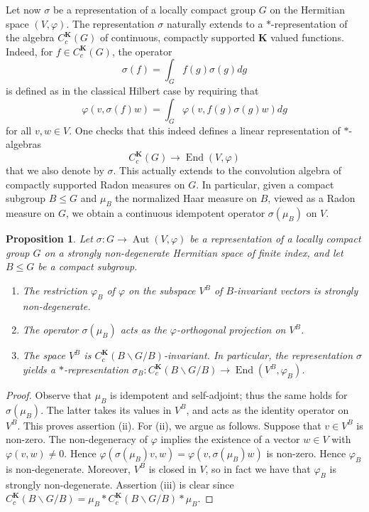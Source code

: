 \documentclass[12pt,a4paper]{amsproc}
\newtheorem{proposition}[theorem]{Proposition}
\theoremstyle{definition}
\DeclareMathOperator{\Aut}{Aut}
\DeclareMathOperator{\End}{End}
\newcommand{\KK}{\mathbf K}
\begin{document}
Let now $\sigma $ be a representation of a locally compact group $G$ on the Hermitian space $(V, \varphi)$. The representation $\sigma$ naturally extends to a $*$-representation of the algebra $C_c^\KK(G)$ of continuous, compactly supported $\KK$ valued functions. Indeed, for $f \in C_c^\KK(G)$, the operator 
$$\sigma(f) = \int_G f(g) \sigma(g)dg$$
is defined as in the classical Hilbert case by requiring that
$$\varphi(v, \sigma(f)w) = \int_G  \varphi(v, f(g)\sigma(g)w)dg$$
for all $v, w \in V$. One checks that this indeed defines a linear representation of $*$-algebras 
$$C_c^\KK(G) \to \End(V, \varphi)$$
that we also denote by $\sigma$. This actually extends to the convolution algebra of compactly supported Radon measures on $G$. In particular, given a compact subgroup $B \leq G$ and $\mu_B$ the normalized Haar measure on $B$, viewed as a Radon measure on $G$, we obtain a continuous idempotent operator $\sigma(\mu_B) $ on $V$. 



\begin{proposition}\label{prop:Hermitian-Hecke}
Let $\sigma \colon G \to \Aut(V, \varphi)$ be a representation of a locally compact group $G$ on a strongly non-degenerate Hermitian space of finite index, and let $B \leq G$ be a compact subgroup. 
\begin{enumerate}[label=(\roman*)]
\item The restriction $\varphi_B$ of $\varphi$ on the subspace $V^B$ of $B$-invariant vectors is strongly non-degenerate. 

\item The operator $\sigma(\mu_B)$ acts as the $\varphi$-orthogonal projection on $V^B$. 

\item The space $V^B$ is $C_c^\KK(B\backslash G/B)$-invariant. In particular, the representation $\sigma$ yields a $*$-representation
$\sigma_B \colon C_c^\KK(B\backslash G/B) \to \End(V^B, \varphi_B)$. 
\end{enumerate}
\end{proposition}

\begin{proof}
Observe that   $\mu_B$ is idempotent and self-adjoint; thus the same holds for $\sigma(\mu_B)$. The latter takes its values in $V^B$, and acts as the identity operator on $V^B$. This proves assertion (ii). For (ii), we argue as follows. Suppose that $v \in V^B$ is non-zero. The non-degeneracy of $\varphi$ implies the existence of a vector $w \in V$ with $\varphi(v, w) \neq 0$. Hence $\varphi(\sigma(\mu_B)v, w) = \varphi(v, \sigma(\mu_B)w)$ is non-zero. Hence $\varphi_B$ is non-degenerate. Moreover, $V^B$ is closed in $V$, so in fact we have that $\varphi_B$ is strongly non-degenerate. Assertion (iii) is clear since $C_c^\KK(B\backslash G/B)  = \mu_B *C_c^\KK(B\backslash G/B)*\mu_B$.
\end{proof}
	
\end{document}
